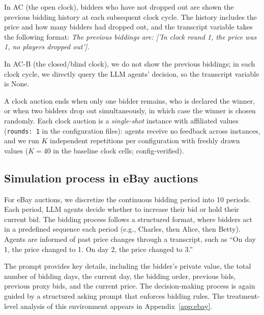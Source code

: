 In AC (the open clock), bidders who have not dropped out are shown the previous bidding history at each subsequent clock cycle. The history includes the price and how many bidders had dropped out,
and the transcript variable takes the following format:
\textit{The previous biddings are:
['In clock round 1, the price was 1,
no players dropped out'].}

In AC-B (the closed/blind clock), we do not show the previous biddings; in each clock cycle, we directly query the LLM agents' decision,
so the transcript variable is None.

A clock auction ends when only one bidder remains, who is declared the winner, or when two bidders drop out simultaneously, in which case the winner is chosen randomly. Each clock auction is a \emph{single-shot} instance with affiliated values (\texttt{rounds:\,1} in the configuration files): agents receive no feedback across instances, and we run $K$ independent repetitions per configuration with freshly drawn values ($K=40$ in the baseline clock cells; config-verified). 

\subsection{Simulation process in eBay auctions}\label{app:ebay-process}

For eBay auctions, we discretize the continuous bidding period into 10 periods. Each period, LLM agents decide whether to increase their bid or hold their current bid. The bidding process follows a structured format, where bidders act in a predefined sequence each period (e.g., Charles, then Alice, then Betty). Agents are informed of past price changes through a transcript, such as ``On day 1, the price changed to 1. On day 2, the price changed to 3.''

The prompt provides key details, including the bidder's private value, the total number of bidding days, the current day, the bidding order, previous bids, previous proxy bids, and the current price. The decision-making process is again guided by a structured asking prompt that enforces bidding rules. The treatment-level analysis of this environment appears in Appendix~\ref{app:ebay}.

